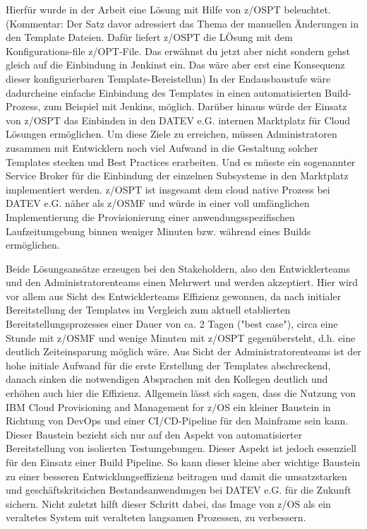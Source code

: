 Hierfür wurde in der Arbeit eine Lösung mit Hilfe von z/OSPT beleuchtet. (Kommentar: Der Satz davor adressiert das Thema der manuellen Änderungen in den Template Dateien. Dafür liefert z/OSPT die LÖsung mit dem Konfigurations-file z/OPT-File. Das erwähnst du jetzt aber nicht sondern gehst gleich auf die Einbindung in Jenkinst ein. Das wäre aber erst eine Konsequenz dieser konfigurierbaren Template-Bereistellun) 
In der Endausbaustufe wäre dadurcheine einfache Einbindung des Templates in einen automatisierten Build-Prozess, zum Beispiel mit Jenkins, möglich.
Darüber hinaus würde der Einsatz von z/OSPT das Einbinden in den DATEV e.G. internen \glqq Marktplatz\grqq{} für Cloud Lösungen ermöglichen.
Um diese Ziele zu erreichen, müssen Administratoren zusammen mit Entwicklern noch viel Aufwand in die Gestaltung solcher Templates stecken und Best Practices erarbeiten.
Und es müsste ein sogenannter \glqq Service Broker\grqq{} für die Einbindung der einzelnen Subsysteme in den \glqq Marktplatz\grqq{} implementiert werden.
z/OSPT ist insgesamt dem cloud native Prozess bei DATEV e.G. näher als z/OSMF und würde in einer voll umfänglichen Implementierung die Provisionierung einer anwendungsspezifischen Laufzeitumgebung binnen weniger Minuten bzw. während eines Builds ermöglichen.

Beide Lösungsansätze erzeugen bei den Stakeholdern, also den Entwicklerteams und den Administratorenteams einen Mehrwert und werden akzeptiert.
Hier wird vor allem aus Sicht des Entwicklerteams Effizienz gewonnen, da nach initialer Bereitstellung der Templates im Vergleich zum aktuell etablierten Bereitstellungsprozesses einer Dauer von ca. 2 Tagen ("best case"), circa eine Stunde mit z/OSMF und wenige Minuten mit z/OSPT gegenübersteht, d.h. eine deutlich Zeiteinsparung möglich wäre.
Aus Sicht der Administratorenteams ist der hohe initiale Aufwand für die erste Erstellung der Templates abschreckend, danach sinken die notwendigen Absprachen mit den Kollegen deutlich und erhöhen auch hier die Effizienz.
Allgemein lässt sich sagen, dass die Nutzung von \glqq IBM Cloud Provisioning and Management for z/OS\grqq{} ein kleiner Baustein in Richtung von DevOps und einer CI/CD-Pipeline für den Mainframe sein kann.
Dieser Baustein bezieht sich nur auf den Aspekt von automatisierter Bereitstellung von isolierten Testumgebungen.
Dieser Aspekt ist jedoch essenziell für den Einsatz einer Build Pipeline.
So kann dieser kleine aber wichtige Baustein zu einer besseren Entwicklungseffizienz beitragen und damit die umsatzstarken und geschäftskritsichen Bestandsanwendungen bei DATEV e.G. für die Zukunft sichern.
Nicht zuletzt hilft dieser Schritt dabei, das Image von z/OS als ein veraltetes System mit veralteten langsamen Prozessen, zu verbessern.

